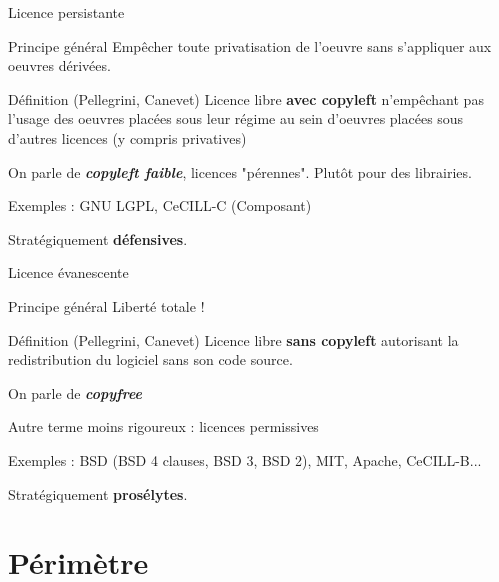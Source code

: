 \documentclass{beamer}
\begin{document}
\begin{frame}{Licence persistante}

\begin{block}{Principe général}
    Empêcher toute privatisation de l'oeuvre sans s'appliquer aux oeuvres dérivées.
  \end{block}

  \begin{alertblock}{Définition (Pellegrini, Canevet)}
    Licence libre \textbf{avec copyleft} n'empêchant pas l'usage des oeuvres placées sous leur régime au sein d'oeuvres placées sous d'autres licences (y compris privatives)
   \end{alertblock}

On parle de \textit{\textbf{copyleft faible}}, licences "pérennes". Plutôt pour des librairies.
 
Exemples : GNU LGPL, CeCILL-C (Composant)

Stratégiquement \textbf{défensives}.

\end{frame}


\begin{frame}{Licence évanescente}
  \begin{block}{Principe général}
    Liberté totale !
  \end{block}

  \begin{alertblock}{Définition (Pellegrini, Canevet)}
    Licence libre \textbf{sans copyleft} autorisant la redistribution du logiciel sans son code source.
   \end{alertblock}

On parle de \textit{\textbf{copyfree}}

Autre terme moins rigoureux : licences permissives 

Exemples : BSD (BSD 4 clauses, BSD 3, BSD 2), MIT, Apache, CeCILL-B... 

Stratégiquement \textbf{prosélytes}.
\end{frame}


\section{Périmètre}
\end{document}
